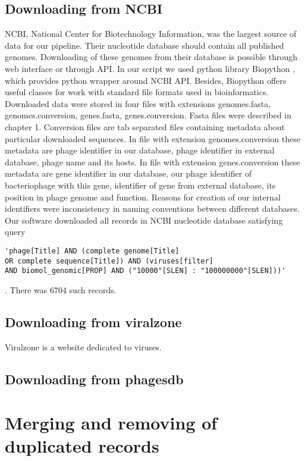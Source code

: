 \subsection{Downloading from NCBI}
NCBI, National Center for Biotechnology Information, was the largest source of data for our pipeline.
Their nucleotide database should contain all published genomes.
Downloading of these genomes from their database is possible through web interface or through API.
In our script we used python library Biopython \cite{biopython}, which provides python wrapper around NCBI API.
Besides, Biopython offers useful classes for work with standard file formats used in bioinformatics.
Downloaded data were stored in four files with extensions genomes.fasta, genomes.conversion, genes.fasta, genes.conversion.
Fasta files were described in chapter 1.
Conversion files are tab separated files containing metadata about particular downloaded sequences.
In file with extension genomes.conversion these metadata are phage identifier in our database, phage identifier in external database, phage name and its hosts.
In file with extension genes.conversion these metadata are gene identifier in our database, our phage identifier of bacteriophage with this gene, identifier of gene from external database, its position in phage genome and function.
Reasons for creation of our internal identifiers were inconsistency in naming conventions between different databases.
Our software downloaded all records in NCBI nucleotide database satisfying query 
\begin{verbatim}
'phage[Title] AND (complete genome[Title] 
OR complete sequence[Title]) AND (viruses[filter] 
AND biomol_genomic[PROP] AND ("10000"[SLEN] : "100000000"[SLEN]))'
\end{verbatim}. There was 6704 such records. 

\subsection{Downloading from viralzone}
Viralzone is a website dedicated to viruses. 
\subsection{Downloading from phagesdb}

\section{Merging and removing of duplicated records}

